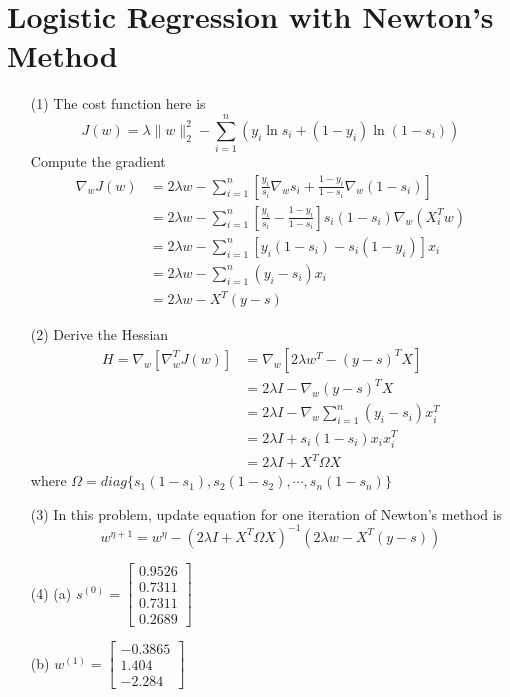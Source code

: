 \documentclass[a4paper,12pt]{article}
\begin{document}
\section{Logistic Regression with Newton’s Method}
\begin{itemize}
\item[(1)] The cost function here is 
$$
J(w) =  \lambda \| w\|_2^2 - \sum_{i=1}^n \left ( y_i \ln s_i + (1-y_i) \ln(1-s_i) \right )
$$
Compute the gradient
\begin{align*}
\nabla_w J(w) 
&= 2 \lambda w - \sum_{i=1}^n \left [ \frac{y_i}{s_i} \nabla_w s_i + \frac{1-y_i}{1-s_i} \nabla_w (1-s_i)\right ]  \\
&= 2 \lambda w - \sum_{i=1}^n \left [ \frac{y_i}{s_i} - \frac{1-y_i}{1-s_i} \right] s_i (1-s_i) \nabla_w (X_i^T w) \\
&= 2 \lambda w - \sum_{i=1}^n \left [ y_i (1-s_i) - s_i(1-y_i)\right ] x_i \\
&= 2 \lambda w - \sum_{i=1}^n (y_i - s_i)x_i \\
&= 2 \lambda w - X^T(y-s)
\end{align*}


\clearpage
\item[(2)]
Derive the Hessian
\begin{align*}
H = \nabla_w \left[ \nabla_w^T J(w) \right] 
&= \nabla_w \left[ 2 \lambda w^T - (y-s)^T X \right] \\
&= 2 \lambda I - \nabla_w (y-s)^T X \\
&= 2 \lambda I - \nabla_w \sum_{i=1}^n (y_i-s_i) x_i^T \\
&= 2 \lambda I + s_i(1 - s_i) x_i x_i^T \\
&= 2 \lambda I + X^T \Omega X
\end{align*}
where $ \Omega = diag\{s_1(1-s_1), s_2(1-s_2), \cdots, s_n(1-s_n)\}$

\clearpage
\item[(3)]
In this problem, update equation for one iteration of Newton’s method is 
$$
w^{\eta+1} = w^{\eta} - (2 \lambda I + X^T \Omega X)^{-1} (2 \lambda w - X^T(y-s))
$$

\clearpage
\item[(4)]
\subitem (a) 
$s^{(0)} = \left [ \begin{array}{c}
0.9526\\
0.7311 \\
0.7311 \\
0.2689
\end{array} \right ] $

\subitem (b) 
$w^{(1)} = \left [ \begin{array}{c}
-0.3865\\
1.404 \\
-2.284
\end{array} \right ] $


\end{itemize}
\end{document}
